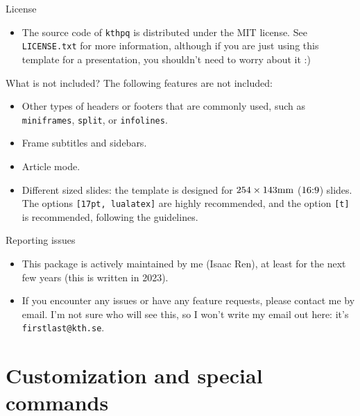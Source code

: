\documentclass[17pt, t, lualatex]{beamer}
\def\kthpq{\texttt{kthpq}}
\begin{document}
\begin{frame}{License}
\begin{itemize}
\item The source code of \kthpq{} is distributed under the MIT license. See \texttt{LICENSE.txt} for more information, although if you are just using this template for a presentation, you shouldn't need to worry about it :)
\end{itemize}
\end{frame}

\begin{frame}{What is not included?}
The following features are not included:
\begin{itemize}
\item Other types of headers or footers that are commonly used, such as \texttt{miniframes}, \texttt{split}, or \texttt{infolines}.
\item Frame subtitles and sidebars.
\item Article mode.
\item Different sized slides: the template is designed for $254 \times 143 \textnormal{mm}$ ($16\textnormal{:}9$) slides. The options \texttt{[17pt, lualatex]} are highly recommended, and the option \texttt{[t]} is recommended, following the guidelines.
\end{itemize}
\end{frame}

\begin{frame}{Reporting issues}
\begin{itemize}
\item This package is actively maintained by me (Isaac Ren), at least for the next few years (this is written in 2023).
\item If you encounter any issues or have any feature requests, please contact me by email. I'm not sure who will see this, so I won't write my email out here: it's \texttt{firstlast@kth.se}.
\end{itemize}
\end{frame}

\section{Customization and special commands}

\insertsectionpage
\end{document}
